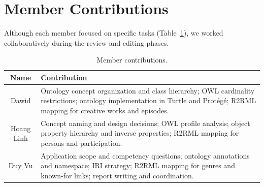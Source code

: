 \section{Member Contributions}
Although each member focused on specific tasks (Table~\ref{tab:member_contributions}), we worked collaboratively during the review and editing phases.

\begin{table}[h]
\centering
\caption{Member contributions.}
\label{tab:member_contributions}
\begin{tabularx}{\textwidth}{cX}
\hline
\textbf{Name} & \textbf{Contribution} \\
\hline
Dawid & Ontology concept organization and class hierarchy; OWL cardinality restrictions; ontology implementation in Turtle and Protégé; R2RML mapping for creative works and episodes. \\
Hoang Linh & Concept naming and design decisions; OWL profile analysis; object property hierarchy and inverse properties; R2RML mapping for persons and participation. \\
Duy Vu & Application scope and competency questions; ontology annotations and namespace; IRI strategy; R2RML mapping for genres and known-for links; report writing and coordination. \\
\hline
\end{tabularx}
\end{table}

